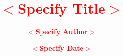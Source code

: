 \newcommand{\file}[1]{\texttt{#1}}

\newcommand{\parameter}[1]{$<$#1$>$}

\newcommand{\orion}{\textsc{Or10n}\xspace}
\newcommand{\riscv}{\mbox{RISC-V}\xspace}
\newcommand{\rvcore}{\textsc{RI5CY}\xspace}
\newcommand{\pulpino}{\textsc{PULPino}\xspace}
\newcommand{\pulp}{\textsc{PULP}\xspace}

\newcommand{\misspar}[1]{\textcolor{red}{\textbf{$<$#1$>$}}}

\makeatletter

\title{\misspar{Specify Title}}%
\author{\misspar{Specify Author}}%
\date{\misspar{Specify Date}}%

\def\@semester{\misspar{Specify Semester}}%
\newcommand{\setsemester}[1]{\def\@semester{#1}}%
\let\semester\setsemester%
\newcommand{\show@semester}{\@semester}%

\def\@reporttype{\misspar{Specify Report Type}}%
\newcommand{\setreporttype}[1]{\def\@reporttype{#1}}%
\let\reporttype\setreporttype%
\newcommand{\show@reporttype}{\@reporttype}%

\def\@titlelogo{}%
\newcommand{\settitlelogo}[1]{\def\@titlelogo{#1}}%
\let\titlelogo\settitlelogo%

\def\@logoheight{7cm}%
\newcommand{\setlogoheight}[1]{\def\@logoheight{#1}}%
\let\logoheight\setlogoheight%
\newcommand{\show@logoheight}{\@logoheight}%

\def\@email{\misspar{Specify E-Mail}}%
\newcommand{\setemail}[1]{\def\@email{#1}}%
\let\email\setemail%
\newcommand{\show@email}{\@email}%

\def\@firstsup{\misspar{Specify First Supervisor}}%
\newcommand{\setfirstsup}[1]{\def\@firstsup{#1}}%
\let\firstsup\setfirstsup%
\newcommand{\show@firstsup}{\@firstsup}%


